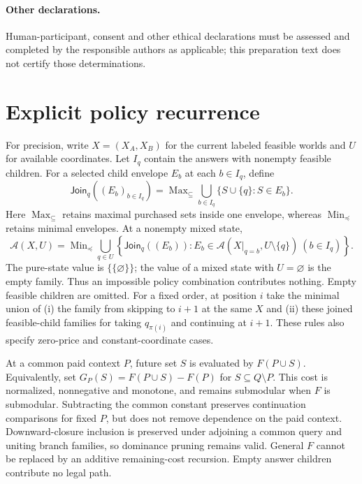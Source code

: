 \documentclass[pdflatex,sn-mathphys-num]{sn-jnl}
\DeclareMathOperator{\Max}{Max}
\DeclareMathOperator{\Min}{Min}
\theoremstyle{thmstyleone}
\theoremstyle{thmstylethree}
\theoremstyle{thmstyletwo}
\begin{document}
\paragraph*{Other declarations.}
Human-participant, consent and other ethical declarations must be assessed and completed by the responsible authors as applicable; this preparation text does not certify those determinations.

\clearpage
\label{page:references-start}

\clearpage
\appendix

\section{Explicit policy recurrence}\label{app:recursion}
For precision, write $X=(X_A,X_B)$ for the current labeled feasible worlds and $U$ for available coordinates. Let $I_q$ contain the answers with nonempty feasible children. For a selected child envelope $E_b$ at each $b\in I_q$, define
\[
 \mathsf{Join}_q((E_b)_{b\in I_q})
 =\Max_{\subseteq}\!\bigcup_{b\in I_q}\{S\cup\{q\}:S\in E_b\}.
\]
Here $\Max_{\subseteq}$ retains maximal purchased sets inside one envelope, whereas $\Min_{\preceq}$ retains minimal envelopes. At a nonempty mixed state,
\[
 \mathcal A(X,U)=\Min_{\preceq}\!\bigcup_{q\in U}
 \left\{\mathsf{Join}_q((E_b)):
 E_b\in\mathcal A(X|_{q=b},U\setminus\{q\})\ (b\in I_q)\right\}.
\]
The pure-state value is $\{\{\varnothing\}\}$; the value of a mixed state with $U=\varnothing$ is the empty family. Thus an impossible policy combination contributes nothing. Empty feasible children are omitted. For a fixed order, at position $i$ take the minimal union of (i) the family from skipping to $i+1$ at the same $X$ and (ii) these joined feasible-child families for taking $q_{\pi(i)}$ and continuing at $i+1$. These rules also specify zero-price and constant-coordinate cases.

At a common paid context $P$, future set $S$ is evaluated by $F(P\cup S)$. Equivalently, set $G_P(S)=F(P\cup S)-F(P)$ for $S\subseteq Q\setminus P$. This cost is normalized, nonnegative and monotone, and remains submodular when $F$ is submodular. Subtracting the common constant preserves continuation comparisons for fixed $P$, but does not remove dependence on the paid context. Downward-closure inclusion is preserved under adjoining a common query and uniting branch families, so dominance pruning remains valid. General $F$ cannot be replaced by an additive remaining-cost recursion. Empty answer children contribute no legal path.
\end{document}
